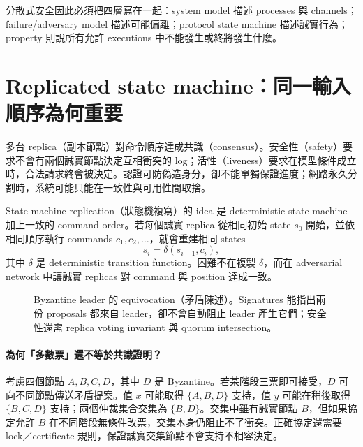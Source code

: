\documentclass[11pt,a4paper,oneside,openany]{book}
\begin{document}
分散式安全因此必須把四層寫在一起：system model 描述 processes 與 channels；failure/adversary model 描述可能偏離；protocol state machine 描述誠實行為；property 則說所有允許 executions 中不能發生或終將發生什麼。

\section{Replicated state machine：同一輸入順序為何重要}
多台 replica（副本節點）對命令順序達成共識（consensus）。安全性（safety）要求不會有兩個誠實節點決定互相衝突的 log；活性（liveness）要求在模型條件成立時，合法請求終會被決定。認證可防偽造身分，卻不能單獨保證進度；網路永久分割時，系統可能只能在一致性與可用性間取捨。

State-machine replication（狀態機複寫）的 idea 是 deterministic state machine 加上一致的 command order。若每個誠實 replica 從相同初始 state $s_0$ 開始，並依相同順序執行 commands $c_1,c_2,\ldots$，就會重建相同 states
\[
 s_i=\delta(s_{i-1},c_i),
\]
其中 $\delta$ 是 deterministic transition function。困難不在複製 $\delta$，而在 adversarial network 中讓誠實 replicas 對 command 與 position 達成一致。

\begin{figure}[htbp]
\centering
{}
\caption{Byzantine leader 的 equivocation（矛盾陳述）。Signatures 能指出兩份 proposals 都來自 leader，卻不會自動阻止 leader 產生它們；安全性還需 replica voting invariant 與 quorum intersection。}
\label{fig:equivocation-timeline}
\end{figure}

\paragraph{為何「多數票」還不等於共識證明？}
考慮四個節點 $A,B,C,D$，其中 $D$ 是 Byzantine。若某階段三票即可接受，$D$ 可向不同節點傳送矛盾提案。值 $x$ 可能取得 $\{A,B,D\}$ 支持，值 $y$ 可能在稍後取得 $\{B,C,D\}$ 支持；兩個仲裁集合交集為 $\{B,D\}$。交集中雖有誠實節點 $B$，但如果協定允許 $B$ 在不同階段無條件改票，交集本身仍阻止不了衝突。正確協定還需要 lock／certificate 規則，保證誠實交集節點不會支持不相容決定。
\end{document}
